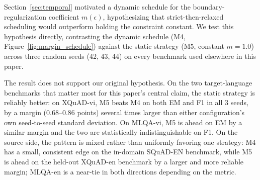 \documentclass[11pt]{article}
\begin{document}
Section~\ref{sec:temporal} motivated a dynamic schedule for the boundary-regularization coefficient $m(\epsilon)$, hypothesizing that strict-then-relaxed scheduling would outperform holding the constraint constant. We test this hypothesis directly, contrasting the dynamic schedule (M4, Figure~\ref{fig:margin_schedule}) against the static strategy (M5, constant $m=1.0$) across three random seeds (42, 43, 44) on every benchmark used elsewhere in this paper.

\begin{table}[H]
\centering
\small
{}
\caption{Dynamic (M4) vs.\ static (M5) boundary regularization, mean $\pm$ SD across 3 seeds at each configuration's epoch-3 checkpoint. Bold marks the better mean per row; unbolded rows are within approximately one SD of each other.}
\label{tab:heldout_source}
\end{table}

The result does not support our original hypothesis. On the two target-language benchmarks that matter most for this paper's central claim, the static strategy is reliably better: on XQuAD-vi, M5 beats M4 on both EM and F1 in all 3 seeds, by a margin (0.68--0.86 points) several times larger than either configuration's own seed-to-seed standard deviation. On MLQA-vi, M5 is ahead on EM by a similar margin and the two are statistically indistinguishable on F1. On the source side, the pattern is mixed rather than uniformly favoring one strategy: M4 has a small, consistent edge on the in-domain SQuAD-EN benchmark, while M5 is ahead on the held-out XQuAD-en benchmark by a larger and more reliable margin; MLQA-en is a near-tie in both directions depending on the metric.
\end{document}
